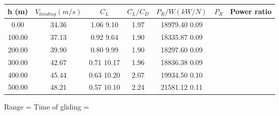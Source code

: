 \begin{tabular}{|ccccccc|} \hline 
h (m) & $V_{landing} (m/s)$ & $C_L$ & $C_L/C_D$ & $P_R/W (kW/N)$ & $P_R$ & Power ratio  \\ \hline 
    0.00 &    34.36 &     1.06     9.10 &     1.97 & 18979.40     0.09 \\ 
  100.00 &    37.13 &     0.92     9.64 &     1.90 & 18335.87     0.09 \\ 
  200.00 &    39.90 &     0.80     9.99 &     1.90 & 18297.60     0.09 \\ 
  300.00 &    42.67 &     0.71    10.17 &     1.96 & 18836.38     0.09 \\ 
  400.00 &    45.44 &     0.63    10.20 &     2.07 & 19934.50     0.10 \\ 
  500.00 &    48.21 &     0.57    10.10 &     2.24 & 21581.12     0.11 \\ \hline 
\end{tabular}
Range = Time of gliding = 